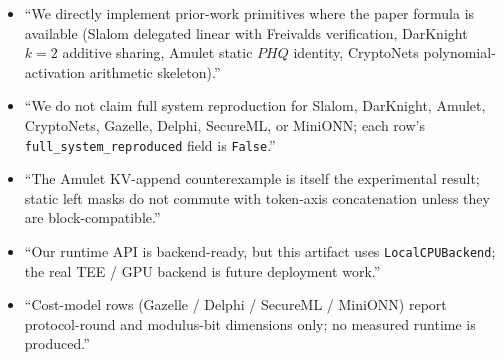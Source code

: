 \begin{itemize}[leftmargin=*, nosep]
  \item ``We directly implement prior-work primitives where the paper formula is available (Slalom delegated linear with Freivalds verification, DarKnight $k=2$ additive sharing, Amulet static $PHQ$ identity, CryptoNets polynomial-activation arithmetic skeleton).''
  \item ``We do not claim full system reproduction for Slalom, DarKnight, Amulet, CryptoNets, Gazelle, Delphi, SecureML, or MiniONN; each row's \texttt{full\_system\_reproduced} field is \texttt{False}.''
  \item ``The Amulet KV-append counterexample is itself the experimental result; static left masks do not commute with token-axis concatenation unless they are block-compatible.''
  \item ``Our runtime API is backend-ready, but this artifact uses \texttt{LocalCPUBackend}; the real TEE / GPU backend is future deployment work.''
  \item ``Cost-model rows (Gazelle / Delphi / SecureML / MiniONN) report protocol-round and modulus-bit dimensions only; no measured runtime is produced.''
\end{itemize}


